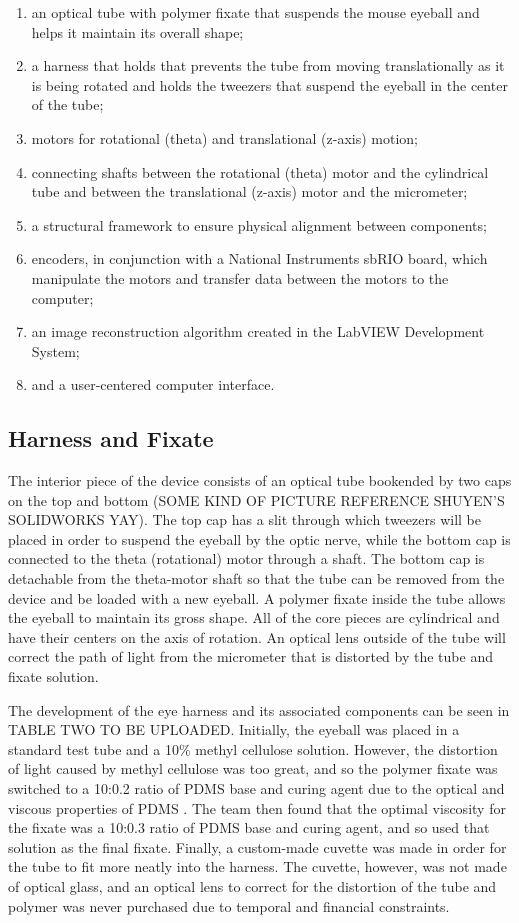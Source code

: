 \documentclass{article}
\begin{document}
\begin{enumerate}
 \item an optical tube with polymer fixate that suspends the mouse eyeball and helps it maintain its overall shape; 
\item a harness that holds that prevents the tube from moving translationally as it is being rotated and holds the tweezers that suspend the eyeball in the center of the tube;
\item motors for rotational (theta) and translational (z-axis) motion; 
\item connecting shafts between the rotational (theta) motor and the cylindrical tube and between the translational (z-axis) motor and the micrometer;
\item a structural framework to ensure physical alignment between components; 
\item encoders, in conjunction with a National Instruments sbRIO board, which manipulate the motors and transfer data between the motors to the computer;  
\item an image reconstruction algorithm created in the LabVIEW Development System;
\item and a user-centered computer interface. 
\end{enumerate}

\subsection{Harness and Fixate}
\label{sec:harness}
	
The interior piece of the device consists of an optical tube bookended by two caps on the top and bottom (SOME KIND OF PICTURE REFERENCE SHUYEN’S SOLIDWORKS YAY).  The top cap has a slit through which tweezers will be placed in order to suspend the eyeball by the optic nerve, while the bottom cap is connected to the theta (rotational) motor through a shaft. The bottom cap is detachable from the theta-motor shaft so that the tube can be removed from the device and be loaded with a new eyeball. A polymer fixate inside the tube allows the eyeball to maintain its gross shape.  All of the core pieces are cylindrical and have their centers on the axis of rotation. An optical lens outside of the tube will correct the path of light from the micrometer that is distorted by the tube and fixate solution.
	
The development of the eye harness and its associated components can be seen in TABLE TWO TO BE UPLOADED. Initially, the eyeball was placed in a standard test tube and a 10\% methyl cellulose solution. However, the distortion of light caused by methyl cellulose was too great, and so the polymer fixate was switched to a 10:0.2 ratio of PDMS base and curing agent due to the optical and viscous properties of PDMS . The team then found that the optimal viscosity for the fixate was a 10:0.3 ratio of PDMS base and curing agent, and so used that solution as the final fixate. Finally, a custom-made cuvette was made in order for the tube to fit more neatly into the harness. The cuvette, however, was not made of optical glass, and an optical lens to correct for the distortion of the tube and polymer was never purchased due to temporal and financial constraints. 
	
\end{document}
